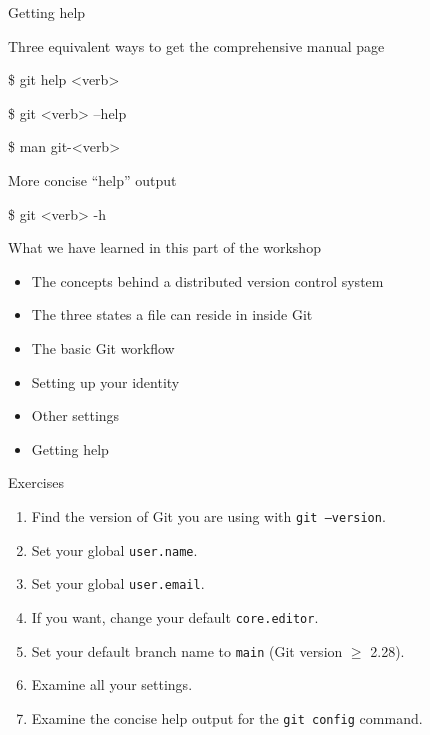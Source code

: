 \documentclass[handout]{beamer}
\begin{document}
\begin{frame}{Getting help}
  \begin{exampleblock}{Three equivalent ways to get the comprehensive manual page}
    \begin{semiverbatim}  
      \item \$ git help <verb>
      \item \$ git <verb> --help
      \item \$ man git-<verb>
    \end{semiverbatim}
  \end{exampleblock}
  \begin{exampleblock}{More concise “help” output }
    \begin{semiverbatim}  
      \item \$ git <verb> -h
    \end{semiverbatim}
  \end{exampleblock}
\end{frame}

\begin{frame}{What we have learned in this part of the workshop}
  \begin{itemize}
    \item The concepts behind a distributed version control system
    \item The three states a file can reside in inside Git
    \item The basic Git workflow
    \item Setting up your identity
    \item Other settings
    \item Getting help
  \end{itemize}
\end{frame}

\begin{frame}{Exercises}
  \begin{enumerate}
    \item Find the version of Git you are using with \texttt{git --version}.
    \item Set your global \texttt{user.name}.
    \item Set your global \texttt{user.email}.
    \item If you want, change your default \texttt{core.editor}.
    \item Set your default branch name to \texttt{main} (Git version $\geqslant$ 2.28).
    \item Examine all your settings. 
    \item Examine the concise help output for the \texttt{git config} command.
  \end{enumerate}
\end{frame}
\end{document}

